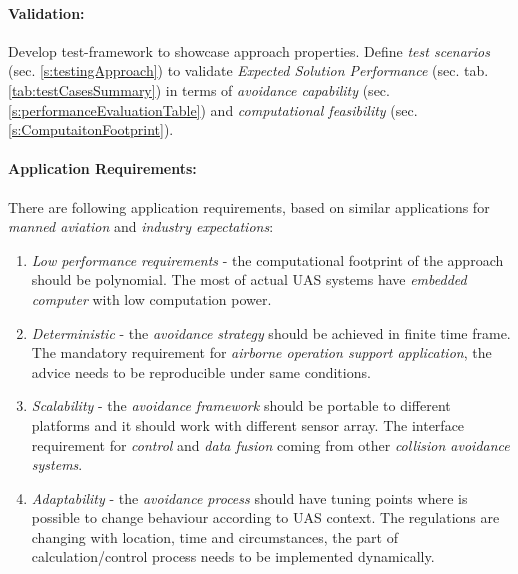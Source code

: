 \paragraph{Validation:} Develop test-framework to showcase approach properties. Define \emph{test scenarios} (sec. \ref{s:testingApproach}) to validate \emph{Expected Solution Performance} (sec.  tab. \ref{tab:testCasesSummary}) in terms of \emph{avoidance capability} (sec. \ref{s:performanceEvaluationTable}) and \emph{computational feasibility} (sec. \ref{s:ComputaitonFootprint}).

\paragraph{Application Requirements:} There are  following application requirements, based on similar applications for \emph{manned aviation} and \emph{industry expectations}:

\begin{enumerate}
    \item \emph{Low performance requirements} - the computational footprint of the approach should be polynomial. The most of actual UAS systems have \emph{embedded computer} with low computation power.
    
    \item \emph{Deterministic} - the \emph{avoidance strategy} should be achieved in finite time frame. The mandatory requirement for \emph{airborne operation support application}, the advice needs to be reproducible under same conditions.
    
    \item \emph{Scalability} - the \emph{avoidance framework} should be portable to different platforms and it should work with different sensor array. The interface requirement for \emph{control} and \emph{data fusion} coming from other \emph{collision avoidance systems}.
    
    \item \emph{Adaptability} - the \emph{avoidance process} should have tuning points where is possible to change behaviour according to UAS context. The regulations are changing with location, time and circumstances, the part of calculation/control process needs to be implemented dynamically.
\end{enumerate}